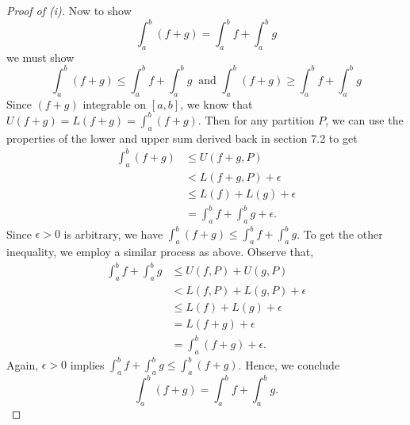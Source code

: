 \begin{proof}[Proof of (i)]
	Now to show 
	\[  \int_{ a }^{ b } (f+g)  = \int_{ a }^{ b } f + \int_{ a }^{ b } g \]
	we must show 
	\[  \int_{ a }^{ b } (f+g) \leq \int_{ a }^{ b } f + \int_{ a }^{ b } g \ \text{ and } \int_{ a }^{ b } (f+g) \geq \int_{ a }^{ b } f + \int_{ a }^{ b } g  \]
	Since \( (f+g)  \) integrable on \( [a,b] \), we know that \( U(f+g) = L(f+g) = \int_{ a }^{ b } (f+g)  \). Then for any partition \( P  \), we can use the properties of the lower and upper sum derived back in section 7.2 to get 
	\begin{align*}
	    \int_{ a }^{ b } (f+g)  &\leq U(f+g, P) \\
								&< L(f+g, P) + \epsilon \\
								&\leq L(f) + L(g) + \epsilon \\
								&= \int_{ a }^{ b } f  + \int_{ a }^{ b } g + \epsilon.
	\end{align*}
	Since \( \epsilon > 0   \) is arbitrary, we have \( \int_{ a }^{ b } (f+g)  \leq \int_{ a }^{ b } f + \int_{ a }^{ b } g  \). To get the other inequality, we employ a similar process as above. Observe that, 
	\begin{align*}
	    \int_{ a }^{ b } f + \int_{ a }^{ b } g &\leq U(f,P) + U(g, P)\\
												&< L(f,P) + L(g,P) + \epsilon \\
												&\leq L(f) + L(g) + \epsilon \\
												&= L(f+g) + \epsilon \\
												&= \int_{ a }^{ b } (f+g) + \epsilon.
	\end{align*}
	Again, \( \epsilon > 0    \) implies \( \int_{ a }^{ b } f + \int_{ a }^{ b }  g \leq \int_{ a }^{ b } (f+g) \). Hence, we conclude
	\[  \int_{ a }^{ b } (f+g) = \int_{ a }^{ b } f + \int_{ a }^{ b } g. \]
	
\end{proof}






